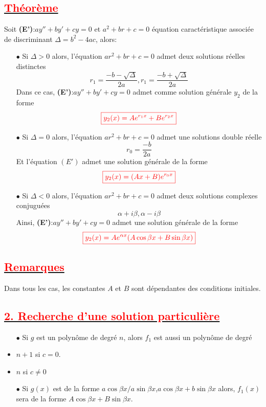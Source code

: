 \documentclass{article}
\begin{document}
\subsection*{\underline{\textbf{\textcolor{red}{Théorème}}}}
Soit \textbf{(E')}:$ay''+by'+cy=0$ et $a^{2}+br+c=0$ équation caractéristique associée de discriminant $\Delta=b^{2}-4ac$, alors:
\begin{itemize}
    \item[$\bullet$] Si $\Delta >0$ alors, l'équation $ar^{2}+br+c=0$ admet deux solutions réelles distinctes \[r_{1}=\frac{-b-\sqrt{\Delta}}{2a}, r_{1}=\frac{-b+\sqrt{\Delta}}{2a}\]
    Dans ce cas, \textbf{(E')}:$ay''+by'+cy=0$ admet comme solution générale $y_{2}$ de la forme\\
    \[\textcolor{red}{ \boxed{ y_{2}(x)=Ae^{r_{1}x}+Be^{r_{2}x} } }\]
    \item[$\bullet$] Si $\Delta = 0$ alors, l'équation $ar^{2}+br+c=0$ admet une solutions double réelle \[r_{0}=\frac{-b}{2a}\]
    Et l'équation $(E')$ admet une solution générale de la forme 
    \[\textcolor{red}{ \boxed{ y_{2}(x)=(Ax+B)e^{r_{0}x} } }\]
    \item[$\bullet$] Si $\Delta <0$ alors, l'équation $ar^{2}+br+c=0$ admet deux solutions complexes conjuguées \[\alpha + i\beta, \alpha - i\beta\]
    Ainsi, \textbf{(E')}:$ay''+by'+cy=0$ admet une solution générale de la forme 
     \[\textcolor{red}{ \boxed{ y_{2}(x)=Ae^{\alpha x}(A\cos \beta x+B\sin \beta x) } }\]
\end{itemize}
\subsection*{\underline{\textbf{\textcolor{red}{Remarques}}}}
Dans tous les cas, les constantes $A$ et $B$ sont dépendantes des conditions initiales.
\subsection*{\underline{\textbf{\textcolor{red}{2. Recherche d'une solution particulière}}}}
\begin{itemize}
    \item[$\bullet$ ] Si $g$ est un polynôme de degré $n$, alors $f_{1}$ est aussi un polynôme de degré
    \item $n+1$ si $c=0$.
    \item $n$ si $c\neq 0$
    \item[$\bullet$ ] Si $g(x)$ est de la forme \( a\cos \beta x / a\sin \beta x \),\( a\cos \beta x + b\sin \beta x \) alors, $f_{1}(x)$ sera de la forme \( A\cos \beta x + B\sin \beta x \).
\end{itemize}
\end{document}
